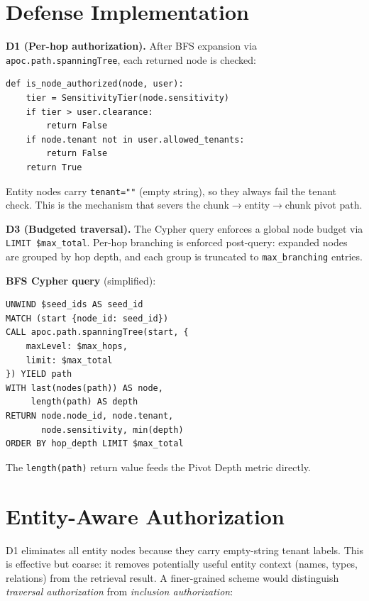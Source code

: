 \documentclass[letterpaper,twocolumn,10pt]{article}
\begin{document}
\section{Defense Implementation}
\label{sec:defense-impl}

\textbf{D1 (Per-hop authorization).} After BFS expansion via
\texttt{apoc.path.spanningTree}, each returned node is checked:

\begin{small}
\begin{verbatim}
def is_node_authorized(node, user):
    tier = SensitivityTier(node.sensitivity)
    if tier > user.clearance:
        return False
    if node.tenant not in user.allowed_tenants:
        return False
    return True
\end{verbatim}
\end{small}

\noindent Entity nodes carry \texttt{tenant=""} (empty string),
so they always fail the tenant check. This is the mechanism that
severs the chunk$\to$entity$\to$chunk pivot path.

\textbf{D3 (Budgeted traversal).} The Cypher query enforces a global
node budget via \texttt{LIMIT \$max\_total}. Per-hop branching is
enforced post-query: expanded nodes are grouped by hop depth, and each
group is truncated to \texttt{max\_branching} entries.

\textbf{BFS Cypher query} (simplified):
\begin{small}
\begin{verbatim}
UNWIND $seed_ids AS seed_id
MATCH (start {node_id: seed_id})
CALL apoc.path.spanningTree(start, {
    maxLevel: $max_hops,
    limit: $max_total
}) YIELD path
WITH last(nodes(path)) AS node,
     length(path) AS depth
RETURN node.node_id, node.tenant,
       node.sensitivity, min(depth)
ORDER BY hop_depth LIMIT $max_total
\end{verbatim}
\end{small}

\noindent The \texttt{length(path)} return value feeds the Pivot
Depth metric directly.

\section{Entity-Aware Authorization}
\label{sec:entity-aware-future}

D1 eliminates all entity nodes because they carry empty-string tenant
labels. This is effective but coarse: it removes potentially useful
entity context (names, types, relations) from the retrieval result.
A finer-grained scheme would distinguish \emph{traversal authorization}
from \emph{inclusion authorization}:
\end{document}
